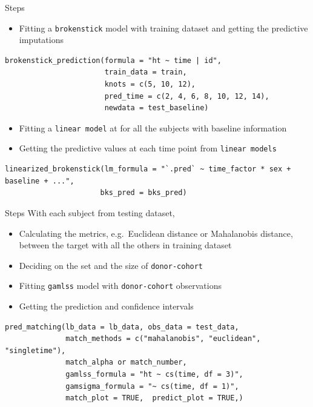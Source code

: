 \documentclass[
  8pt,
  ignorenonframetext,
]{beamer}
\providecommand{\tightlist}{%
  \setlength{\itemsep}{0pt}\setlength{\parskip}{0pt}}
\begin{document}
\begin{frame}[fragile]{Steps}
\protect\hypertarget{steps}{}
\begin{itemize}
\tightlist
\item
  Fitting a \texttt{brokenstick} model with training dataset and getting
  the predictive imputations
\end{itemize}

\begin{verbatim}
brokenstick_prediction(formula = "ht ~ time | id",
                       train_data = train,
                       knots = c(5, 10, 12),
                       pred_time = c(2, 4, 6, 8, 10, 12, 14),
                       newdata = test_baseline)
\end{verbatim}

\begin{itemize}
\tightlist
\item
  Fitting a \texttt{linear\ model} at for all the subjects with baseline
  information
\item
  Getting the predictive values at each time point from
  \texttt{linear\ models}
\end{itemize}

\begin{verbatim}
linearized_brokenstick(lm_formula = "`.pred` ~ time_factor * sex + baseline + ...",
                      bks_pred = bks_pred)
\end{verbatim}
\end{frame}

\begin{frame}[fragile]{Steps}
\protect\hypertarget{steps-1}{}
With each subject from testing dataset,

\begin{itemize}
\tightlist
\item
  Calculating the metrics, e.g.~Euclidean distance or Mahalanobis
  distance, between the target with all the others in training dataset
\item
  Deciding on the set and the size of \texttt{donor-cohort}
\item
  Fitting \texttt{gamlss} model with \texttt{donor-cohort} observations
\item
  Getting the prediction and confidence intervals
\end{itemize}

\begin{verbatim}
pred_matching(lb_data = lb_data, obs_data = test_data,
              match_methods = c("mahalanobis", "euclidean", "singletime"),
              match_alpha or match_number,
              gamlss_formula = "ht ~ cs(time, df = 3)",  
              gamsigma_formula = "~ cs(time, df = 1)",
              match_plot = TRUE,  predict_plot = TRUE,)
\end{verbatim}
\end{frame}
\end{document}
